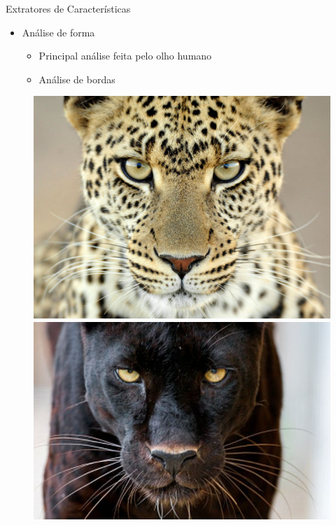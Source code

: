 \documentclass{beamer}
\begin{document}
\begin{frame}{Extratores de Características}
  \begin{itemize}
   \item Análise de forma\newline
   \begin{itemize}
      \item Principal análise feita pelo olho humano\newline
      \item Análise de bordas\newline
   \end{itemize}
   
  \end{itemize}
  	\begin{figure}
	    \centering
	    \begin{minipage}{.4\textwidth}
	      \centering
	      \includegraphics[width=.9\linewidth]{onca.jpg}
	    \end{minipage}%
	    \begin{minipage}{.4\textwidth}
	      \centering
	      \includegraphics[width=.9\linewidth]{pantera.jpg}
	    \end{minipage}
\end{figure}

\end{frame}
\end{document}
